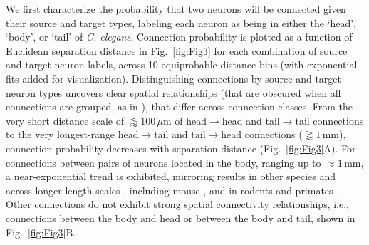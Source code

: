 \documentclass[10pt,letterpaper]{article}
\begin{document}
We first characterize the probability that two neurons will be connected given their source and target types, labeling each neuron as being in either the `head', `body', or `tail' of \emph{C. elegans}.
Connection probability is plotted as a function of Euclidean separation distance in Fig.~\ref{fig:Fig3} for each combination of source and target neuron labels, across 10 equiprobable distance bins (with exponential fits added for visualization).
Distinguishing connections by source and target neuron types uncovers clear spatial relationships (that are obscured when all connections are grouped, as in \cite{Azulay:2016cg}), that differ across connection classes.
From the very short distance scale of $\lessapprox 100\,\mu$m of head$\rightarrow$head and tail$\rightarrow$tail connections to the very longest-range head$\rightarrow$tail and tail$\rightarrow$head connections ($\gtrapprox 1\,$mm), connection probability decreases with separation distance (Fig.~\ref{fig:Fig3}A).
For connections between pairs of neurons located in the body, ranging up to $\approx 1$\,mm, a near-exponential trend is exhibited, mirroring results in other species and across longer length scales \cite{Wang:2016gg}, including mouse \cite{Goulas:2016hr, Fulcher:2016ck}, and in rodents and primates \cite{Horvat:2016ia}.
Other connections do not exhibit strong spatial connectivity relationships, i.e., connections between the body and head or between the body and tail, shown in Fig.~\ref{fig:Fig3}B.
\end{document}
